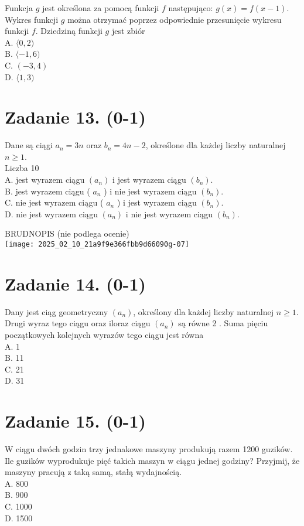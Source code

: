 \documentclass[10pt]{article}
\begin{document}
Funkcja \(g\) jest określona za pomocą funkcji \(f\) następująco: \(g(x)=f(x-1)\). Wykres funkcji \(g\) można otrzymać poprzez odpowiednie przesunięcie wykresu funkcji \(f\). Dziedziną funkcji \(g\) jest zbiór\\
A. \(\langle 0,2)\)\\
B. \(\langle-1,6)\)\\
C. \((-3,4)\)\\
D. \(\langle 1,3)\)

\section*{Zadanie 13. (0-1)}
Dane są ciągi \(a_{n}=3 n\) oraz \(b_{n}=4 n-2\), określone dla każdej liczby naturalnej \(n \geq 1\).\\
Liczba 10\\
A. jest wyrazem ciągu \(\left(a_{n}\right)\) i jest wyrazem ciągu \(\left(b_{n}\right)\).\\
B. jest wyrazem ciągu ( \(a_{n}\) ) i nie jest wyrazem ciągu \(\left(b_{n}\right)\).\\
C. nie jest wyrazem ciągu ( \(a_{n}\) ) i jest wyrazem ciągu \(\left(b_{n}\right)\).\\
D. nie jest wyrazem ciągu \(\left(a_{n}\right)\) i nie jest wyrazem ciągu \(\left(b_{n}\right)\).

BRUDNOPIS (nie podlega ocenie)\\
\texttt{[image: 2025\_02\_10\_21a9f9e366fbb9d66090g-07]}

\section*{Zadanie 14. (0-1)}
Dany jest ciąg geometryczny \(\left(a_{n}\right)\), określony dla każdej liczby naturalnej \(n \geq 1\). Drugi wyraz tego ciągu oraz iloraz ciągu \(\left(a_{n}\right)\) są równe 2 . Suma pięciu początkowych kolejnych wyrazów tego ciągu jest równa\\
A. 1\\
B. 11\\
C. 21\\
D. 31

\section*{Zadanie 15. (0-1)}
W ciągu dwóch godzin trzy jednakowe maszyny produkują razem 1200 guzików. Ile guzików wyprodukuje pięć takich maszyn w ciągu jednej godziny? Przyjmij, że maszyny pracują z taką samą, stałą wydajnością.\\
A. 800\\
B. 900\\
C. 1000\\
D. 1500
\end{document}
